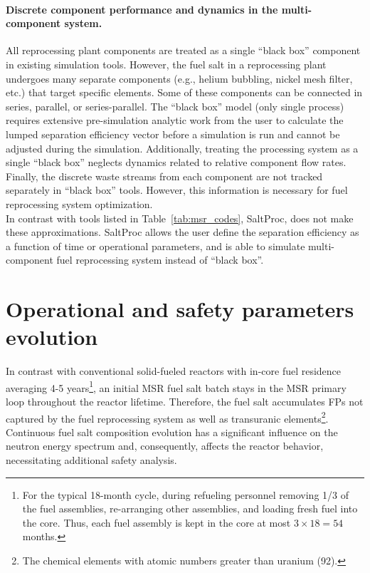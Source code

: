 \paragraph*{Discrete component performance and dynamics in the multi-component 
system.} All reprocessing plant components are treated as a single ``black 
box'' component in existing simulation tools. However, the fuel salt in a 
reprocessing plant undergoes many separate components (e.g., helium bubbling, 
nickel mesh filter, etc.) that target specific elements. Some of these 
components can be connected in series, parallel, or series-parallel. The 
``black box'' model (only single process) requires extensive pre-simulation 
analytic work from the user to calculate the lumped separation efficiency 
vector before a simulation is run and cannot be adjusted during the 
simulation. Additionally, treating the processing system as a single ``black 
box'' neglects dynamics related to relative component flow rates. Finally, the 
discrete waste streams from each component are not tracked separately in 
``black box'' tools. However, this information is necessary for fuel 
reprocessing system optimization.\\

In contrast with tools listed in Table~\ref{tab:msr_codes}, SaltProc, does not 
make these approximations. SaltProc allows the user define the separation 
efficiency as a function of time or operational parameters, and is able to 
simulate multi-component fuel reprocessing system instead of ``black box''.

\section{Operational and safety parameters evolution} 
\label{sec:saf-par-literature}
In contrast with conventional solid-fueled reactors with in-core fuel 
residence averaging 4-5 years\footnote{For the typical 18-month cycle, during 
refueling personnel removing 1/3 of the fuel assemblies, re-arranging other 
assemblies, and loading fresh fuel into the core. Thus, each fuel assembly is 
kept in the core at most $3\times 18=54$ months.}, an initial \gls{MSR} fuel 
salt batch stays in the \gls{MSR} primary loop throughout the reactor 
lifetime. 
Therefore, the fuel salt accumulates \glspl{FP} not captured by the fuel 
reprocessing system as well as transuranic elements\footnote{The chemical 
elements with atomic numbers greater than uranium (92).}. Continuous fuel 
salt composition evolution has a significant influence on the neutron energy 
spectrum and, consequently, affects the reactor behavior, necessitating 
additional safety analysis.

